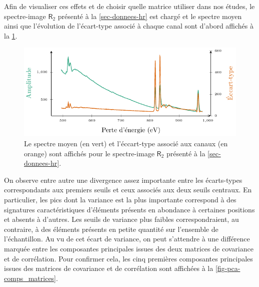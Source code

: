        Afin de visualiser ces effets et de choisir quelle matrice utiliser dans nos études, le spectre-image $\mathsf{R}_2$ présenté à la \cref{sec-donnees-hr} est chargé et le spectre moyen ainsi que l'évolution de l'écart-type associé à chaque canal sont d'abord affichés à la \cref{fig-pca-variance-data}.
        \begin{figure}
            \centering
            \includegraphics{img/chapitre1/figure16/data_variance.pdf}
            \caption{Le spectre moyen (en vert) et l'éccart-type associé aux canaux (en orange) sont affichés pour le spectre-image $\mathsf{R}_2$ présenté à la \cref{sec-donnees-hr}.
                \protect\label{fig-pca-variance-data}}
        \end{figure}
        On observe entre autre une divergence assez importante entre les écarts-types correspondants aux premiers seuils et ceux associés aux deux seuils centraux. En particulier, les pics dont la variance est la plus importante correspond à des signatures caractéristiques d'éléments présents en abondance à certaines positions et absents à d'autres. Les seuils de variance plus faibles correspondraient, au contraire, à des éléments présents en petite quantité sur l'ensemble de l'échantillon. Au vu de cet écart de variance, on peut s'attendre à une différence marquée entre les composantes principales issues des deux matrices de covariance et de corrélation. Pour confirmer cela, les cinq premières composantes principales issues des matrices de covariance et de corrélation sont affichées à la \cref{fig-pca-comps_matrices}.
